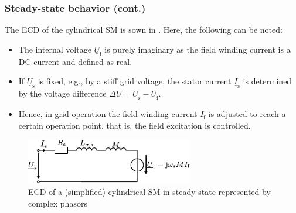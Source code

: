 \begin{frame}
	\frametitle{Steady-state behavior (cont.)} 
	The ECD of the cylindrical SM is sown in . Here, the following can be noted:
	\begin{itemize}
		\item The internal voltage $\underline{U}_\mathrm{i}$ is purely imaginary as the field winding current is a DC current and defined as real.
		\item If $\underline{U}_\mathrm{s}$ is fixed, e.g., by a stiff grid voltage, the stator current $\underline{I}_\mathrm{s}$ is determined by the voltage difference $\Delta\underline{U} = \underline{U}_\mathrm{s} - \underline{U}_\mathrm{i}$.
		\item Hence, in grid operation the field winding current $I_\mathrm{f}$ is adjusted to reach a certain operation point, that is, the field excitation is controlled.
	\end{itemize}
    \begin{figure}
        \centering
        \includegraphics[width=0.65\textwidth]{fig/lec07/SM_ECD_steady_state.pdf}
        \caption{ECD of a (simplified) cylindrical SM in steady state represented by complex phasors}
        \label{fig:SM_ECD_steady_state}
    \end{figure}
\end{frame}

